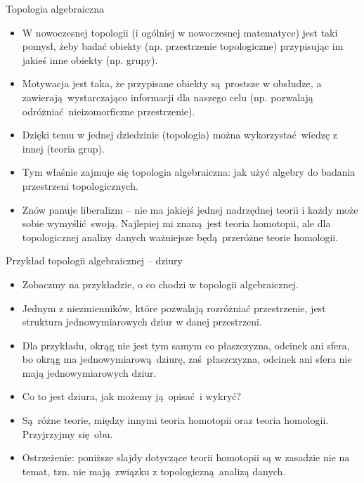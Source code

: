 \documentclass{beamer}
\begin{document}
\begin{frame}{Topologia algebraiczna}
\begin{itemize}
	\item W nowoczesnej topologii (i ogólniej w nowoczesnej matematyce) jest taki pomysł, żeby badać obiekty (np. przestrzenie topologiczne) przypisując im jakieś inne obiekty (np. grupy).
	\item Motywacja jest taka, że przypisane obiekty są prostsze w obsłudze, a zawierają wystarczająco informacji dla naszego celu (np. pozwalają odróżniać nieizomorficzne przestrzenie).
	\item Dzięki temu w jednej dziedzinie (topologia) można wykorzystać wiedzę z innej (teoria grup).
	\item Tym właśnie zajmuje się topologia algebraiczna: jak użyć algebry do badania przestrzeni topologicznych.
	\item Znów panuje liberalizm -- nie ma jakiejś jednej nadrzędnej teorii i każdy może sobie wymyślić swoją. Najlepiej mi znaną jest teoria homotopii, ale dla topologicznej analizy danych ważniejsze będą przeróżne teorie homologii.
\end{itemize}
\end{frame}

\begin{frame}{Przykład topologii algebraicznej -- dziury}
\begin{itemize}
	\item Zobaczmy na przykładzie, o co chodzi w topologii algebraicznej.
	\item Jednym z niezmienników, które pozwalają rozróżniać przestrzenie, jest struktura jednowymiarowych dziur w danej przestrzeni.
	\item Dla przykładu, okrąg nie jest tym samym co płaszczyzna, odcinek ani sfera, bo okrąg ma jednowymiarową dziurę, zaś płaszczyzna, odcinek ani sfera nie mają jednowymiarowych dziur.
	\item Co to jest dziura, jak możemy ją opisać i wykryć?
	\item Są różne teorie, między innymi teoria homotopii oraz teoria homologii. Przyjrzyjmy się obu.
	\item Ostrzeżenie: poniższe slajdy dotyczące teorii homotopii są w zasadzie nie na temat, tzn. nie mają związku z topologiczną analizą danych.
\end{itemize}
\end{frame}
\end{document}

